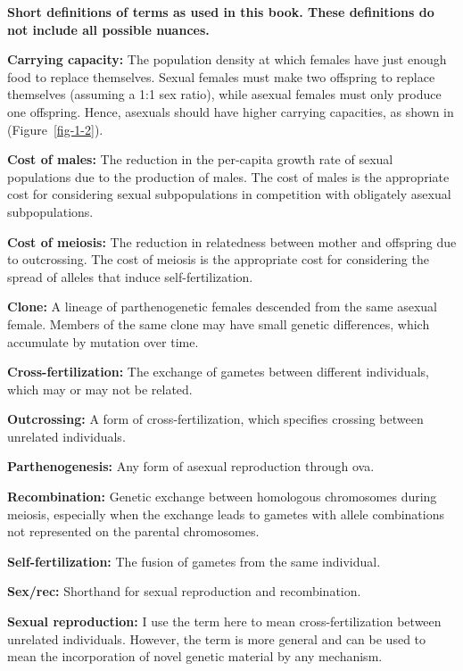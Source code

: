 \documentclass[
  letterpaper,
]{book}
\begin{document}
\begin{tcolorbox}[enhanced jigsaw, rightrule=.15mm, bottomtitle=1mm, opacitybacktitle=0.6, titlerule=0mm, opacityback=0, colbacktitle=quarto-callout-tip-color!10!white, arc=.35mm, coltitle=black, title=\textcolor{quarto-callout-tip-color}{\faLightbulb}\hspace{0.5em}{Box 1.1}, breakable, left=2mm, bottomrule=.15mm, leftrule=.75mm, toptitle=1mm, toprule=.15mm, colframe=quarto-callout-tip-color-frame, colback=white]

\textbf{Short definitions of terms as used in this book. These
definitions do not include all possible nuances.}

\textbf{Carrying capacity:} The population density at which females have
just enough food to replace themselves. Sexual females must make two
offspring to replace themselves (assuming a 1:1 sex ratio), while
asexual females must only produce one offspring. Hence, asexuals should
have higher carrying capacities, as shown in (Figure~\ref{fig-1-2}).

\textbf{Cost of males:} The reduction in the per-capita growth rate of
sexual populations due to the production of males. The cost of males is
the appropriate cost for considering sexual subpopulations in
competition with obligately asexual subpopulations.

\textbf{Cost of meiosis:} The reduction in relatedness between mother
and offspring due to outcrossing. The cost of meiosis is the appropriate
cost for considering the spread of alleles that induce
self-fertilization.

\textbf{Clone:} A lineage of parthenogenetic females descended from the
same asexual female. Members of the same clone may have small genetic
differences, which accumulate by mutation over time.

\textbf{Cross-fertilization:} The exchange of gametes between different
individuals, which may or may not be related.

\textbf{Outcrossing:} A form of cross-fertilization, which specifies
crossing between unrelated individuals.

\textbf{Parthenogenesis:} Any form of asexual reproduction through ova.

\textbf{Recombination:} Genetic exchange between homologous chromosomes
during meiosis, especially when the exchange leads to gametes with
allele combinations not represented on the parental chromosomes.

\textbf{Self-fertilization:} The fusion of gametes from the same
individual.

\textbf{Sex/rec:} Shorthand for sexual reproduction and recombination.

\textbf{Sexual reproduction:} I use the term here to mean
cross-fertilization between unrelated individuals. However, the term is
more general and can be used to mean the incorporation of novel genetic
material by any mechanism.

\end{tcolorbox}
\end{document}
